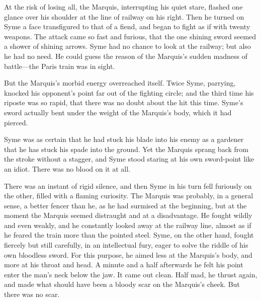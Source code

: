 At the risk of losing all, the Marquis, interrupting his quiet stare, flashed one glance over his shoulder at the line of railway on his right. Then he turned on Syme a face transfigured to that of a fiend, and began to fight as if with twenty weapons. The attack came so fast and furious, that the one shining sword seemed a shower of shining arrows. Syme had no chance to look at the railway; but also he had no need. He could guess the reason of the Marquis’s sudden madness of battle⁠—the Paris train was in sight.

But the Marquis’s morbid energy overreached itself. Twice Syme, parrying, knocked his opponent’s point far out of the fighting circle; and the third time his riposte was so rapid, that there was no doubt about the hit this time. Syme’s sword actually bent under the weight of the Marquis’s body, which it had pierced.

Syme was as certain that he had stuck his blade into his enemy as a gardener that he has stuck his spade into the ground. Yet the Marquis sprang back from the stroke without a stagger, and Syme stood staring at his own sword-point like an idiot. There was no blood on it at all.

There was an instant of rigid silence, and then Syme in his turn fell furiously on the other, filled with a flaming curiosity. The Marquis was probably, in a general sense, a better fencer than he, as he had surmised at the beginning, but at the moment the Marquis seemed distraught and at a disadvantage. He fought wildly and even weakly, and he constantly looked away at the railway line, almost as if he feared the train more than the pointed steel. Syme, on the other hand, fought fiercely but still carefully, in an intellectual fury, eager to solve the riddle of his own bloodless sword. For this purpose, he aimed less at the Marquis’s body, and more at his throat and head. A minute and a half afterwards he felt his point enter the man’s neck below the jaw. It came out clean. Half mad, he thrust again, and made what should have been a bloody scar on the Marquis’s cheek. But there was no scar.

